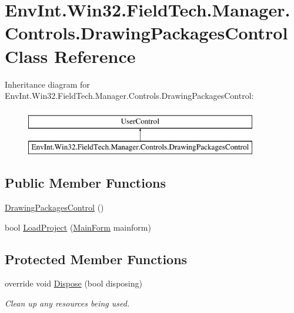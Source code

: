 \hypertarget{class_env_int_1_1_win32_1_1_field_tech_1_1_manager_1_1_controls_1_1_drawing_packages_control}{}\section{Env\+Int.\+Win32.\+Field\+Tech.\+Manager.\+Controls.\+Drawing\+Packages\+Control Class Reference}
\label{class_env_int_1_1_win32_1_1_field_tech_1_1_manager_1_1_controls_1_1_drawing_packages_control}
Inheritance diagram for Env\+Int.\+Win32.\+Field\+Tech.\+Manager.\+Controls.\+Drawing\+Packages\+Control\+:\begin{figure}[H]
\begin{center}
\leavevmode
\includegraphics[height=2.000000cm]{class_env_int_1_1_win32_1_1_field_tech_1_1_manager_1_1_controls_1_1_drawing_packages_control}
\end{center}
\end{figure}
\subsection*{Public Member Functions}
\begin{DoxyCompactItemize}
\item 
\hyperlink{class_env_int_1_1_win32_1_1_field_tech_1_1_manager_1_1_controls_1_1_drawing_packages_control_a96c9517b64a37d2f883856d2589ddacf}{Drawing\+Packages\+Control} ()
\item 
bool \hyperlink{class_env_int_1_1_win32_1_1_field_tech_1_1_manager_1_1_controls_1_1_drawing_packages_control_a6f10aadd4fe9b150e0f2ff8cf150d65d}{Load\+Project} (\hyperlink{class_env_int_1_1_win32_1_1_field_tech_1_1_manager_1_1_main_form}{Main\+Form} mainform)
\end{DoxyCompactItemize}
\subsection*{Protected Member Functions}
\begin{DoxyCompactItemize}
\item 
override void \hyperlink{class_env_int_1_1_win32_1_1_field_tech_1_1_manager_1_1_controls_1_1_drawing_packages_control_ae6e5c9c10c31cfa7bacf0c6eb078e6fb}{Dispose} (bool disposing)
\begin{DoxyCompactList}\small\item\em Clean up any resources being used. \end{DoxyCompactList}\end{DoxyCompactItemize}


